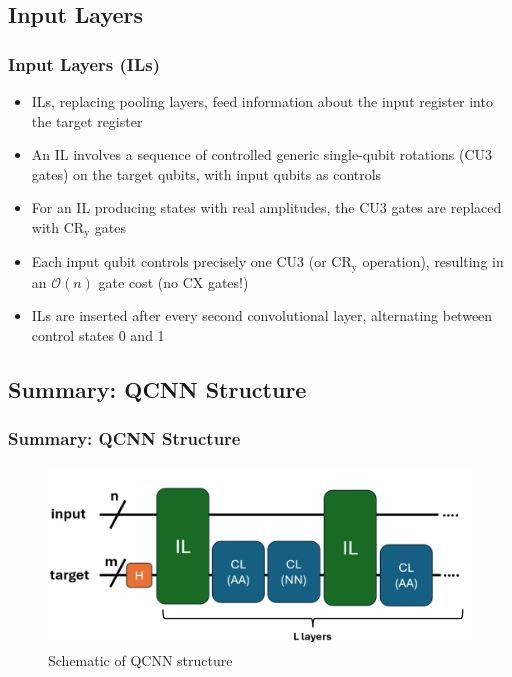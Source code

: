 \documentclass{beamer}
\begin{document}
\subsection{Input Layers}
\begin{frame}
\frametitle{Input Layers (ILs)}
\begin{itemize}
\item ILs, replacing pooling layers, feed information about the input register into the target register 
\item An IL involves a sequence of controlled generic single-qubit rotations (\alert{CU3 gates}) on the target qubits, with input qubits as controls
\item For an IL producing states with \alert{real} amplitudes, the CU3 gates are replaced with \alert{$\text{CR}_\text{y}$ gates}
\item Each input qubit controls precisely one CU3 (or $\text{CR}_\text{y}$ operation), resulting in an \alert{$\mathcal{O}(n)$} gate cost (no CX gates!)
\item ILs are inserted after every second convolutional layer, alternating between control states 0 and 1  
\end{itemize}
\end{frame}

\subsection{Summary: QCNN Structure}
\begin{frame}
\frametitle{Summary: QCNN Structure}
\begin{figure}[h]
\centering
\includegraphics[width=\linewidth]{im/QCNN_structure}
\caption{Schematic of QCNN structure}
\end{figure}
\end{frame}
\end{document}
